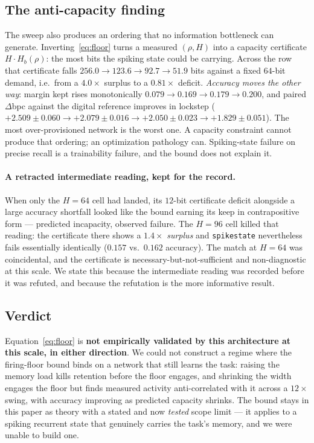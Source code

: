 \subsection{The anti-capacity finding}
\label{sec:bound-anticapacity}

The sweep also produces an ordering that no information bottleneck can generate.
Inverting~\eqref{eq:floor} turns a measured $(\rho, H)$ into a capacity certificate
$H \cdot H_b(\rho)$: the most bits the spiking state could be carrying. Across the row that
certificate falls $256.0 \to 123.6 \to 92.7 \to 51.9$ bits against a fixed $64$-bit demand,
i.e.\ from a $4.0\times$ surplus to a $0.81\times$ deficit. \emph{Accuracy moves the other
way}: margin kept rises monotonically $0.079 \to 0.169 \to 0.179 \to 0.200$, and paired
$\Delta$bpc against the digital reference improves in lockstep
($+2.509 \pm 0.060 \to +2.079 \pm 0.016 \to +2.050 \pm 0.023 \to +1.829 \pm 0.051$). The most
over-provisioned network is the worst one. A capacity constraint cannot produce that
ordering; an optimization pathology can. Spiking-state failure on precise recall is a
trainability failure, and the bound does not explain it.

\paragraph{A retracted intermediate reading, kept for the record.}
When only the $H{=}64$ cell had landed, its $12$-bit certificate deficit alongside a large
accuracy shortfall looked like the bound earning its keep in contrapositive form --- predicted
incapacity, observed failure. The $H{=}96$ cell killed that reading: the certificate there
shows a $1.4\times$ \emph{surplus} and \texttt{spikestate} nevertheless fails essentially
identically ($0.157$ vs.\ $0.162$ accuracy). The match at $H{=}64$ was coincidental, and the
certificate is necessary-but-not-sufficient and non-diagnostic at this scale. We state this
because the intermediate reading was recorded before it was refuted, and because the
refutation is the more informative result.

\subsection{Verdict}
\label{sec:bound-verdict}

Equation~\eqref{eq:floor} is \textbf{not empirically validated by this architecture at this
scale, in either direction}. We could not construct a regime where the firing-floor bound
binds on a network that still learns the task: raising the memory load kills retention before
the floor engages, and shrinking the width engages the floor but finds measured activity
anti-correlated with it across a $12\times$ swing, with accuracy improving as predicted
capacity shrinks. The bound stays in this paper as theory with a stated and now \emph{tested}
scope limit --- it applies to a spiking recurrent state that genuinely carries the task's
memory, and we were unable to build one.


